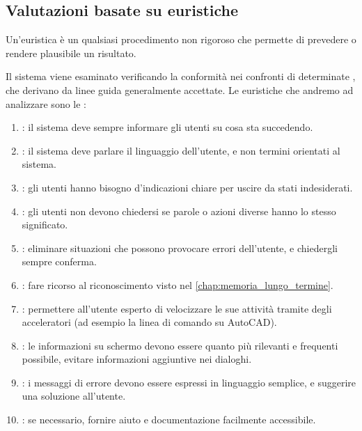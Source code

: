 \subsection{Valutazioni basate su euristiche}

Un'euristica è un qualsiasi procedimento non rigoroso che permette di prevedere o rendere plausibile un risultato.

Il sistema viene esaminato verificando la conformità nei confronti di determinate , che derivano da linee guida generalmente accettate. Le euristiche che andremo ad analizzare sono le :
\label{chap:euristiche_nielsen}

\begin{enumerate}
    \item {}: il sistema deve sempre informare gli utenti su cosa sta succedendo.
    \item {}: il sistema deve parlare il linguaggio dell'utente, e non termini orientati al sistema.
    \item {}: gli utenti hanno bisogno d'indicazioni chiare per uscire da stati indesiderati.
    \item {}: gli utenti non devono chiedersi se parole o azioni diverse hanno lo stesso significato.
    \item {}: eliminare situazioni che possono provocare errori dell'utente, e chiedergli sempre conferma.
    \item {}: fare ricorso al riconoscimento visto nel \autoref{chap:memoria_lungo_termine}.
    \item {}: permettere all'utente esperto di velocizzare le sue attività tramite degli acceleratori (ad esempio la linea di comando su AutoCAD).
    \item {}: le informazioni su schermo devono essere quanto più rilevanti e frequenti possibile, evitare informazioni aggiuntive nei dialoghi.
    \item {}: i messaggi di errore devono essere espressi in linguaggio semplice, e suggerire una soluzione all'utente.
    \item {}: se necessario, fornire aiuto e documentazione facilmente accessibile.
\end{enumerate}

